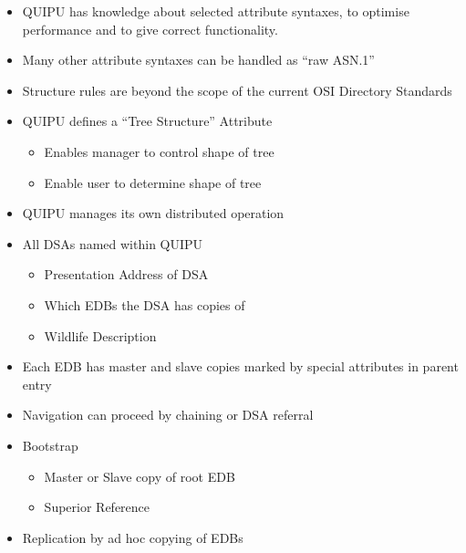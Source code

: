 \begin {bwslide}
\begin {itemize}
\item QUIPU has knowledge about selected attribute syntaxes,
to optimise performance and to give correct functionality.

\item Many other attribute syntaxes can be handled as ``raw ASN.1''

\item Structure rules are beyond the scope of the current OSI Directory
Standards

\item QUIPU defines a ``Tree Structure'' Attribute
\begin {itemize}
\item Enables manager to control shape of tree
\item Enable user to determine shape of tree
\end {itemize}

\end {itemize}
\end {bwslide}



\begin {bwslide}
\begin {itemize}
\item QUIPU manages its own distributed operation
\item All DSAs named within QUIPU
\begin {itemize}
\item Presentation Address of DSA
\item Which EDBs the DSA has copies of
\item Wildlife Description
\end {itemize}

\item Each EDB has master and slave copies marked by special attributes in
parent entry
\item Navigation can proceed by chaining or DSA referral

\item Bootstrap
\begin {itemize}
\item Master or Slave copy of root EDB
\item Superior Reference
\end {itemize}

\item Replication by ad hoc copying of EDBs
\end {itemize}
\end {bwslide}



